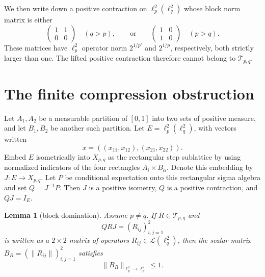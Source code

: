 \documentclass[11pt]{amsart}
\newtheorem{lemma}{Lemma}
\theoremstyle{remark}
\newcommand{\calT}{\mathcal T}
\newcommand{\calL}{\mathcal L}
\begin{document}
We then write down a positive contraction on $\ell_p^2(\ell_q^2)$ whose block
norm matrix is either
\[
        \begin{pmatrix}1&1\\0&0\end{pmatrix}
        \quad(q>p),
        \qquad\text{or}\qquad
        \begin{pmatrix}1&0\\1&0\end{pmatrix}
        \quad(p>q).
\]
These matrices have $\ell_p^2$ operator norm $2^{1/p'}$ and $2^{1/p}$,
respectively, both strictly larger than one.  The lifted positive contraction
therefore cannot belong to $\calT_{p,q}$.

\section*{The finite compression obstruction}

Let $A_1,A_2$ be a measurable partition of $[0,1]$ into two sets of positive
measure, and let $B_1,B_2$ be another such partition.  Let
$E=\ell_p^2(\ell_q^2)$, with vectors written
\[
        x=((x_{11},x_{12}),(x_{21},x_{22})).
\]
Embed $E$ isometrically into $X_{p,q}$ as the rectangular step sublattice by
using normalized indicators of the four rectangles $A_i\times B_\alpha$.
Denote this embedding by $J:E\to X_{p,q}$.  Let $P$ be conditional expectation
onto this rectangular sigma algebra and set $Q=J^{-1}P$.  Then $J$ is a
positive isometry, $Q$ is a positive contraction, and $QJ=I_E$.

\begin{lemma}[block domination]
\label{lem:block-domination}
Assume $p\ne q$.  If $R\in\calT_{p,q}$ and
\[
        QRJ=(R_{ij})_{i,j=1}^2
\]
is written as a $2\times2$ matrix of operators
$R_{ij}\in\calL(\ell_q^2)$, then the scalar matrix
$B_R=(\|R_{ij}\|)_{i,j=1}^2$ satisfies
\[
        \|B_R\|_{\ell_p^2\to\ell_p^2}\le 1.
\]
\end{lemma}
\end{document}

